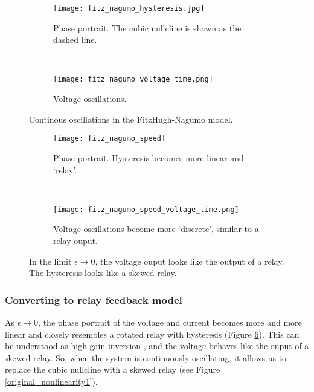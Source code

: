 \documentclass[a4paper, 12pt]{article}
\begin{document}
\begin{figure}
\centering
    \begin{subfigure}[b]{0.45\textwidth}
        \texttt{[image: fitz\_nagumo\_hysteresis.jpg]}
        \caption{Phase portrait. The cubic nullcline is shown as the dashed line.}
        \label{fig:FN_intro_hysteresis}
    \end{subfigure}
    ~ %
    \begin{subfigure}[b]{0.45\textwidth}
        \texttt{[image: fitz\_nagumo\_voltage\_time.png]}
        \caption{Voltage oscillations.}
        \label{fig:FN_intro_voltage}
    \end{subfigure}
    \caption{Continous oscillations in the FitzHugh-Nagumo model.}
    \label{fig:FN_intro}
\end{figure}

\begin{figure}
\centering
    \begin{subfigure}[b]{0.45\textwidth}
        \texttt{[image: fitz\_nagumo\_speed]}
        \caption{Phase portrait. Hysteresis becomes more linear and `relay'.}
        \label{fig:FN_eps_hysteresis}
    \end{subfigure}
    ~ %
    \begin{subfigure}[b]{0.45\textwidth}
        \texttt{[image: fitz\_nagumo\_speed\_voltage\_time.png]}
        \caption{Voltage oscillations become more `discrete', similar to a relay ouput.}
        \label{fig:FN_eps_voltage}
    \end{subfigure}
    \caption{In the limit $\epsilon\rightarrow0$, the voltage ouput looks like the output of a relay. The hysteresis looks like a skewed relay. }
    \label{fig:FN_eps_zero}
\end{figure}

\subsubsection{Converting to relay feedback model}\label{sec:FN_to_relay}

As $\epsilon\rightarrow 0$, the phase portrait of the voltage and current becomes more and more linear and closely resembles a rotated relay with hysteresis (Figure \ref{fig:FN_eps_zero}). This can be understood as  high gain inversion \cite{goodwin}, and the voltage behaves like the ouput of a skewed relay. So, when the system is continuously oscillating, it allows us to replace the cubic nullcline with a skewed relay (see Figure \ref{original_nonlinearity1}). 
\end{document}
